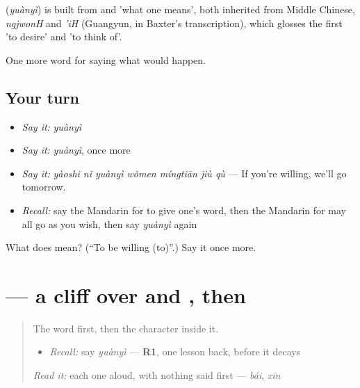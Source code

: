 \begin{cousinweb}
\textbf{} (\emph{yuànyì}) is built from  and  'what one means', both inherited from Middle Chinese, \emph{ngjwonH} and \emph{'iH} (Guangyun, in Baxter's transcription), which glosses the first 'to desire' and 'to think of'.
\end{cousinweb}

\begin{grammarlens}[title={What you've built}]
One more word for saying what would happen.
\end{grammarlens}

\subsection*{Your turn}
\begin{itemize}
\raggedright
  \item \emph{Say it:} \emph{yuànyì}
  \item \emph{Say it:} \emph{yuànyì}, once more
  \item \emph{Say it:} \emph{yàoshi nǐ yuànyì wǒmen míngtiān jiù qù} — If you're willing, we'll go tomorrow.
  \item \emph{Recall:} say the Mandarin for to give one's word, then the Mandarin for may all go as you wish, then say \emph{yuànyì} again
\end{itemize}

\begin{tcolorbox}[breakable,colback=teal!4,colframe=teal!35!black,title={Before you move on}]
What does  mean? (\textquotedblleft{}To be willing (to)\textquotedblright{}.) Say it once more.
\end{tcolorbox}
\section[\texorpdfstring{\zh{愿} (yuàn)}{愿 (yuàn)}]{ — a cliff over  and , then }

\label{lesson:ZH-W535-yuan-wish}



\begin{quote}
The word first, then the character inside it.

\begin{itemize}
\raggedright
  \item \emph{Recall:} say \emph{yuànyì} — \textbf{R1}, one lesson back, before it decays
\end{itemize}

\begin{quote}
 
\end{quote}

\emph{Read it:} each one aloud, with nothing said first — \emph{bái}, \emph{xīn}
\end{quote}

